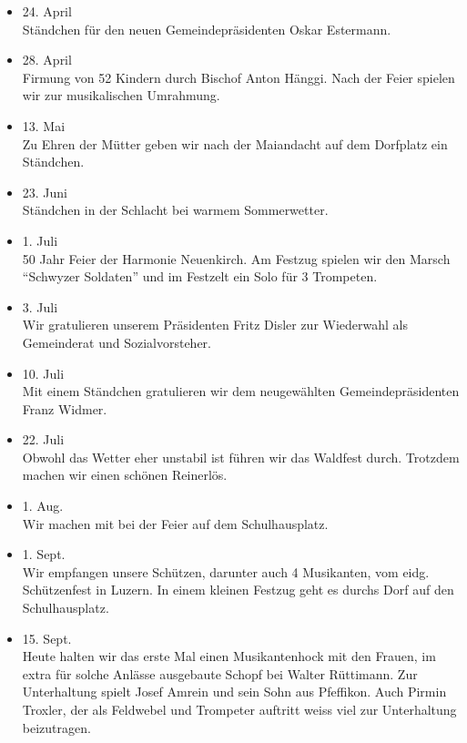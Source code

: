 \begin{multicols}{2}
\begin{itemize}
        \item[]24. April\\
        Ständchen für den neuen Gemeindepräsidenten Oskar Estermann.

        \item[]28. April\\
        Firmung von 52 Kindern durch Bischof Anton Hänggi. Nach der Feier
        spielen wir zur musikalischen Umrahmung.

        \item[]13. Mai\\
        Zu Ehren der Mütter geben wir nach der Maiandacht auf dem Dorfplatz ein
        Ständchen.

        \item[]23. Juni\\
        Ständchen in der Schlacht bei warmem Sommerwetter.

        \item[]1. Juli\\
        50 Jahr Feier der Harmonie Neuenkirch. Am Festzug spielen wir den Marsch
        \enquote{Schwyzer Soldaten} und im Festzelt ein Solo für 3 Trompeten.

        \item[]3. Juli\\
        Wir gratulieren unserem Präsidenten Fritz Disler zur Wiederwahl als
        Gemeinderat und Sozialvorsteher.

        \item[]10. Juli\\
        Mit einem Ständchen gratulieren wir dem neugewählten Gemeindepräsidenten
        Franz Widmer.

        \item[]22. Juli\\
        Obwohl das Wetter eher unstabil ist führen wir das Waldfest durch.
        Trotzdem machen wir einen schönen Reinerlös.

        \item[]1. Aug.\\
        Wir machen mit bei der Feier auf dem Schulhausplatz.

        \item[]1. Sept.\\
        Wir empfangen unsere Schützen, darunter auch 4 Musikanten, vom eidg.
        Schützenfest in Luzern. In einem kleinen Festzug geht es durchs Dorf auf
        den Schulhausplatz.

        \item[]15. Sept.\\
        Heute halten wir das erste Mal einen Musikantenhock mit den Frauen, im
        extra für solche Anlässe ausgebaute Schopf bei Walter Rüttimann. Zur
        Unterhaltung spielt Josef Amrein und sein Sohn aus Pfeffikon. Auch
        Pirmin Troxler, der als Feldwebel und Trompeter auftritt weiss viel zur
        Unterhaltung beizutragen.


\end{itemize}
\end{multicols}
